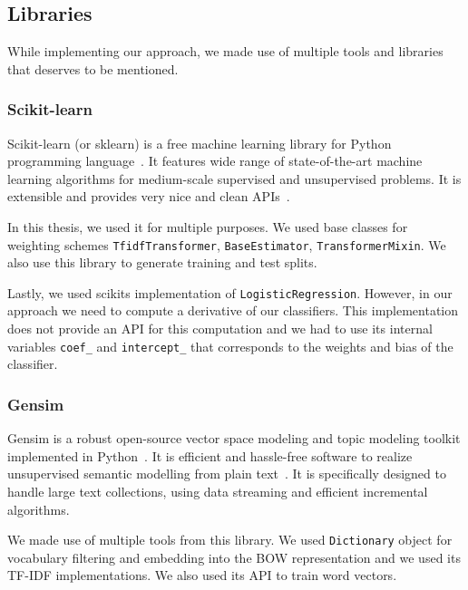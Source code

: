     \subsection{Libraries} 

    While implementing our approach, we made use of multiple tools and libraries that deserves to be mentioned.

    \subsubsection{Scikit-learn}
    
    Scikit-learn (or sklearn) is a free machine learning library for Python programming language~\cite{scikit-learn}.
    It features wide range of state-of-the-art machine learning algorithms for medium-scale supervised and unsupervised problems.
    It is extensible and provides very nice and clean APIs~\cite{sklearn_api}.
    
    In this thesis, we used it for multiple purposes.
    We used base classes for weighting schemes \texttt{TfidfTransformer}, \texttt{BaseEstimator}, \texttt{TransformerMixin}.
    We also use this library to generate training and test splits. 
    
    Lastly, we used scikits implementation of \texttt{LogisticRegression}.
    However, in our approach we need to compute a derivative of our classifiers. 
    This implementation does not provide an API for this computation and we had to use
    its internal variables \texttt{coef\_} and \texttt{intercept\_} that corresponds to the weights and bias of the classifier.
    
    \subsubsection{Gensim}
    
    Gensim is a robust open-source vector space modeling and topic modeling toolkit implemented in Python~\cite{rehurek_lrec}. 
    It is efficient and hassle-free software to realize unsupervised semantic modelling from plain text~\cite{bird2009natural}. %
    It is specifically designed to handle large text collections, using data streaming and efficient incremental algorithms. 
    
    We made use of multiple tools from this library. 
    We used \texttt{Dictionary} object for vocabulary filtering and embedding into the BOW representation and we used its TF-IDF implementations.
    We also used its API to train word vectors. 
    
